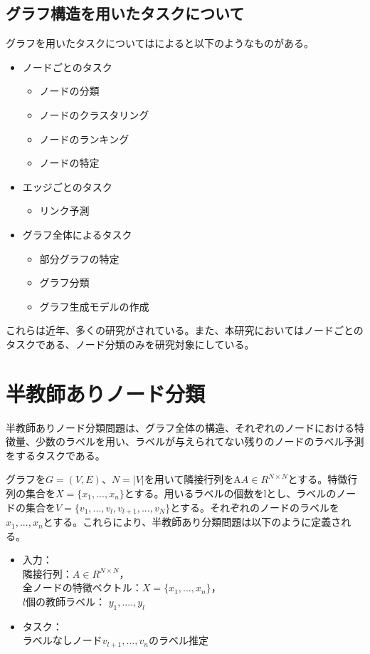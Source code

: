 \subsection{グラフ構造を用いたタスクについて}
グラフを用いたタスクについては\cite{link-mining}によると以下のようなものがある。
\begin{itemize}
\item ノードごとのタスク
	\begin{itemize}
	\item ノードの分類
	\item ノードのクラスタリング
	\item ノードのランキング
    \item ノードの特定
	\end{itemize}
\item エッジごとのタスク
	\begin{itemize}
	\item リンク予測
	\end{itemize}
\item グラフ全体によるタスク
	\begin{itemize}
    \item 部分グラフの特定
    \item グラフ分類
    \item グラフ生成モデルの作成
	\end{itemize}
\end{itemize}

これらは近年、多くの研究がされている。また、本研究においてはノードごとのタスクである、ノード分類のみを研究対象にしている。

\section{半教師ありノード分類}
半教師ありノード分類問題は、グラフ全体の構造、それぞれのノードにおける特徴量、少数のラベルを用い、ラベルが与えられてない残りのノードのラベル予測をするタスクである。

グラフを$G=(V,E)$、$N = |V|$を用いて隣接行列をA$A \in R^{N\times N}$とする。特徴行列の集合を$X = \{x_{1},..., x_{n}\}$とする。用いるラベルの個数をlとし、ラベルのノードの集合を$V = \{ v_{1}, . . . , v_{l}, v_{l+1}, . . . , v_{N}\}$とする。それぞれのノードのラベルを$x_{1}, ..., x_{n}$とする。これらにより、半教師あり分類問題は以下のように定義される。


\begin{itemize}
\item 入力：\\
隣接行列：$A\in R^{N\times N}$，\\
全ノードの特徴ベクトル：$X=\{x_{1}, ..., x_{n}\}$，\\
$l$個の教師ラベル： $y_{1}, ...., y_{l}$
\item タスク：\\
ラベルなしノード$v_{l+1}, ..., v_{n}のラベル推定$
\end{itemize}

